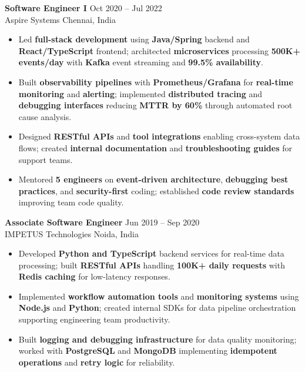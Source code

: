 \documentclass[letterpaper,10pt]{article}
\newcommand{\resumeItem}[1]{\item\small #1}
\newcommand{\resumeSubheading}[4]{
  \vspace{6pt}
  \noindent
  \textbf{#1} \hfill {\footnotesize #2} \\
  [-1pt]
  \noindent
  \small #3 \hfill {\small #4}
  \vspace{3pt}
}
\newcommand{\resumeItemsStart}{\vspace{-2pt}\begin{itemize}}
\newcommand{\resumeItemsEnd}{\end{itemize}\vspace{6pt}}
\begin{document}
\resumeSubheading
{Software Engineer I}{Oct 2020 -- Jul 2022}
{Aspire Systems}{Chennai, India}
\resumeItemsStart
\resumeItem{Led \textbf{full-stack development} using \textbf{Java/Spring} backend and \textbf{React/TypeScript} frontend; architected \textbf{microservices} processing \textbf{500K+ events/day} with \textbf{Kafka} event streaming and \textbf{99.5\% availability}.}
\resumeItem{Built \textbf{observability pipelines} with \textbf{Prometheus/Grafana} for \textbf{real-time monitoring} and \textbf{alerting}; implemented \textbf{distributed tracing} and \textbf{debugging interfaces} reducing \textbf{MTTR by 60\%} through automated root cause analysis.}
\resumeItem{Designed \textbf{RESTful APIs} and \textbf{tool integrations} enabling cross-system data flows; created \textbf{internal documentation} and \textbf{troubleshooting guides} for support teams.}
\resumeItem{Mentored \textbf{5 engineers} on \textbf{event-driven architecture}, \textbf{debugging best practices}, and \textbf{security-first} coding; established \textbf{code review standards} improving team code quality.}
\resumeItemsEnd
\vspace{-12pt}

\resumeSubheading
{Associate Software Engineer}{Jun 2019 -- Sep 2020}
{IMPETUS Technologies}{Noida, India}
\resumeItemsStart
\resumeItem{Developed \textbf{Python and TypeScript} backend services for real-time data processing; built \textbf{RESTful APIs} handling \textbf{100K+ daily requests} with \textbf{Redis caching} for low-latency responses.}
\resumeItem{Implemented \textbf{workflow automation tools} and \textbf{monitoring systems} using \textbf{Node.js} and \textbf{Python}; created internal SDKs for data pipeline orchestration supporting engineering team productivity.}
\resumeItem{Built \textbf{logging and debugging infrastructure} for data quality monitoring; worked with \textbf{PostgreSQL} and \textbf{MongoDB} implementing \textbf{idempotent operations} and \textbf{retry logic} for reliability.}
\resumeItemsEnd
\vspace{-8pt}


\end{document}

